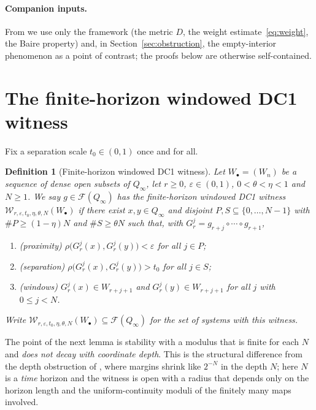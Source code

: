 \documentclass[11pt]{article}
\newtheorem{definition}[theorem]{Definition}
\newcommand{\Q}{Q_\infty}
\newcommand{\F}{\mathcal{F}}
\newcommand{\W}{\mathcal{W}}
\begin{document}
\paragraph{Companion inputs.}
From \cite{companion} we use only the framework (the metric $D$, the weight
estimate~\eqref{eq:weight}, the Baire property) and, in Section~\ref{sec:obstruction},
the empty-interior phenomenon as a point of contrast; the proofs below are otherwise
self-contained.

\section{The finite-horizon windowed DC1 witness}\label{sec:witness}

Fix a separation scale \(t_0\in(0,1)\) once and for all.

\begin{definition}[Finite-horizon windowed DC1 witness]\label{def:witness}
Let $W_\bullet=(W_n)$ be a sequence of dense open subsets of $\Q$, let $r\ge0$,
$\varepsilon\in(0,1)$, \(0<\theta<\eta<1\) and $N\ge1$.  We say $g\in\F(\Q)$ has the
\emph{finite-horizon windowed DC1 witness}
$\W_{r,\varepsilon,t_0,\eta,\theta,N}(W_\bullet)$ if there exist $x,y\in\Q$ and disjoint
$P,S\subseteq\{0,\dots,N-1\}$ with $\#P\ge(1-\eta)N$ and $\#S\ge\theta N$ such that, with
$G^j_r=g_{r+j}\circ\cdots\circ g_{r+1}$,
\begin{enumerate}
\item[(W1)] (\emph{proximity}) $\rho\bigl(G^j_r(x),G^j_r(y)\bigr)<\varepsilon$ for all
$j\in P$;
\item[(W2)] (\emph{separation}) $\rho\bigl(G^j_r(x),G^j_r(y)\bigr)>t_0$ for all
$j\in S$;
\item[(W3)] (\emph{windows}) $G^j_r(x)\in W_{r+j+1}$ and $G^j_r(y)\in W_{r+j+1}$ for all
$j$ with $0\le j<N$.
\end{enumerate}
Write $\W_{r,\varepsilon,t_0,\eta,\theta,N}(W_\bullet)\subseteq\F(\Q)$ for the set of systems
with this witness.
\end{definition}

The point of the next lemma is stability with a modulus that is finite for each $N$ and
\emph{does not decay with coordinate depth}.  This is the structural difference from the
depth obstruction of \cite[Remark~3.6]{companion}, where margins shrink like $2^{-N}$ in
the depth $N$; here $N$ is a \emph{time} horizon and the witness is open with a radius
that depends only on the horizon length and the uniform-continuity moduli of the
finitely many maps involved.
\end{document}
